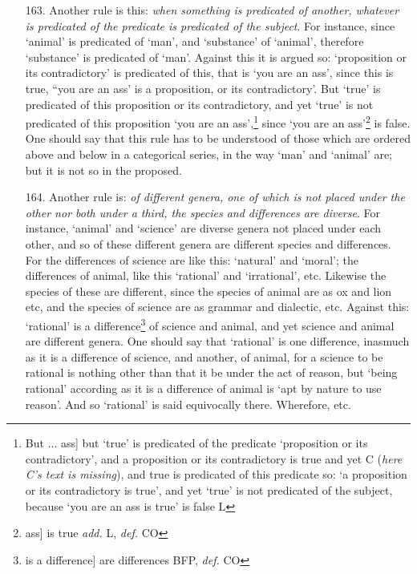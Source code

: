 \begin{itemize}
\item[163.] Another rule is this: \textit{when something is predicated of another, whatever is predicated of the predicate is predicated of the subject}. For instance, since `animal' is predicated of `man', and `substance' of `animal', therefore `substance' is predicated of `man'. Against this it is argued so: `proposition or its contradictory' is predicated of this, that is `you are an ass', since this is true, ``you are an ass' is a proposition, or its contradictory'. But `true' is predicated of this proposition or its contradictory, and yet `true' is not predicated of this proposition `you are an ass',\footnote{But ... ass] but `true' is predicated of the predicate `proposition or its contradictory', and a proposition or its contradictory is true and yet C (\textit{here C's text is missing}), and true is predicated of this predicate so: `a proposition or its contradictory is true', and yet `true' is not predicated of the subject, because `you are an ass is true' is false L} since `you are an ass'\footnote{ass] is true \textit{add.} L, \textit{def.} CO} is false. One should say that this rule has to be understood of those which are ordered above and below in a categorical series, in the way `man' and `animal' are; but it is not so in the proposed.
\item[164.] Another rule is: \textit{of different genera, one of which is not placed under the other nor both under a third, the species and differences are diverse}. For instance, `animal' and `science' are diverse genera not placed under each other, and so of these different genera are different species and differences. For the differences of science are like this: `natural' and `moral'; the differences of animal, like this `rational' and `irrational', etc. Likewise the species of these are different, since the species of animal are as ox and lion etc, and the species of science are as grammar and dialectic, etc. Against this: `rational' is a difference\footnote{is a difference] are differences BFP, \textit{def.} CO} of science and animal, and yet science and animal are different genera. One should say that `rational' is one difference, inasmuch as it is a difference of science, and another, of animal, for a science to be rational is nothing other than that it be under the act of reason, but `being rational' according as it is a difference of animal is `apt by nature to use reason'. And so `rational' is said equivocally there. Wherefore, etc.

\end{itemize}
